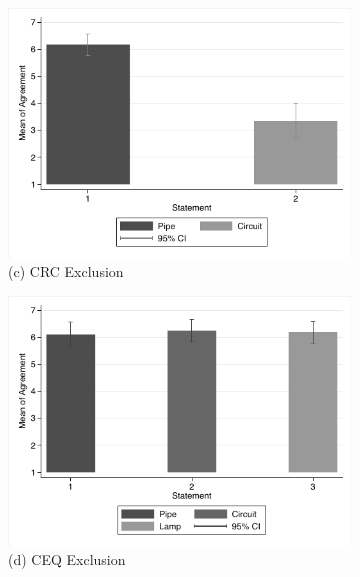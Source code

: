 \documentclass[egregdoesnotlikesansseriftitles,12pt]{scrartcl}
\begin{document}
\begin{landscape}
\begin{figure}[h!]
\begin{subfigure}[t]{0.28\textwidth}
      \includegraphics[scale=0.7]{figures/cir_crc_bar.pdf}
      \caption{\textsf{\scriptsize(c) CRC Exclusion}}
      \label{fig:cir_crc_bar}
   \end{subfigure}
   \begin{subfigure}[t]{0.28\textwidth}
      \includegraphics[scale=0.7]{figures/cir_ceq_bar.pdf}
      \caption{\textsf{\scriptsize(d) CEQ Exclusion}}
      \label{fig:cir_ceq_bar}
   \end{subfigure}
   \begin{subfigure}[t]{0.28\textwidth}

\end{subfigure}
\end{figure}
\end{landscape}
\end{document}
